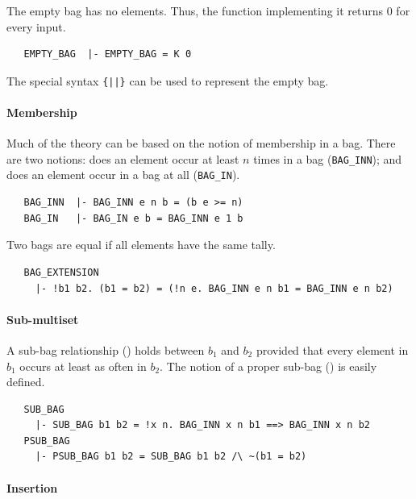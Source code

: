 {The empty bag has no elements. Thus, the function implementing it
returns $0$ for every input.
%
\begin{hol}
\begin{verbatim}
   EMPTY_BAG  |- EMPTY_BAG = K 0
\end{verbatim}
\end{hol}

\noindent The special syntax {\verb+{||}+} can be used to represent the empty
bag.

\paragraph {Membership}

Much of the theory can be based on the notion of membership in a
bag. There are two notions: does an element occur at least $n$ times
in a bag ({\small\verb+BAG_INN+}); and does an element occur in a bag
at all ({\small\verb+BAG_IN+}).
%
\begin{hol}
\begin{verbatim}
   BAG_INN  |- BAG_INN e n b = (b e >= n)
   BAG_IN   |- BAG_IN e b = BAG_INN e 1 b
\end{verbatim}
\end{hol}
%
Two bags are equal if all elements have the same tally.
%
\begin{hol}
\begin{verbatim}
   BAG_EXTENSION
     |- !b1 b2. (b1 = b2) = (!n e. BAG_INN e n b1 = BAG_INN e n b2)
\end{verbatim}
\end{hol}

\paragraph{Sub-multiset}

A sub-bag relationship () holds between $b_1$ and
$b_2$ provided that every element in $b_1$ occurs at least as often in
$b_2$. The notion of a proper sub-bag () is easily
defined.
%
\begin{hol}
\begin{verbatim}
   SUB_BAG
     |- SUB_BAG b1 b2 = !x n. BAG_INN x n b1 ==> BAG_INN x n b2
   PSUB_BAG
     |- PSUB_BAG b1 b2 = SUB_BAG b1 b2 /\ ~(b1 = b2)
\end{verbatim}
\end{hol}

\paragraph{Insertion}

}
